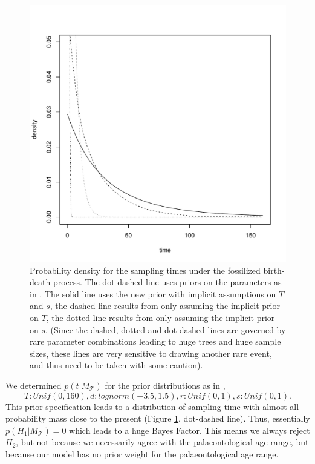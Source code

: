 \documentclass[11pt]{article}
\begin{document}
\begin{figure}
\includegraphics[width=12cm]{priors.pdf}
\caption{\label{hist8_older}Probability density for the sampling times under the fossilized birth-death process. The dot-dashed line uses priors on the parameters as in \cite{gavryushkina2015bayesian}. 
The solid line uses the new prior with implicit assumptions on $T$ and $s$, the dashed line results from only assuming the implicit prior on $T$, the dotted line results from only assuming the  implicit prior on $s$. 
(Since the dashed, dotted and dot-dashed lines are governed by rare parameter combinations leading to huge trees and huge sample sizes, these lines are very sensitive to drawing another rare event, and thus need to be taken with some caution).}
\label{Fig:Prior}
\end{figure}

We determined $p(t|M_\mathcal{T})$ for the prior distributions as in \cite{gavryushkina2015bayesian}, 
$$T: Unif(0,160), d: lognorm(-3.5,1.5), r: Unif(0,1), s: Unif(0,1).$$ This prior specification leads to a distribution of sampling time with almost all probability mass close to the present (Figure \ref{Fig:Prior}, dot-dashed line). Thus, essentially $p(H_1|M_\mathcal{T})=0$  which leads to a huge Bayes Factor. This means we always reject $H_2$, but not because we necessarily agree with the palaeontological age range, but because our model has no prior weight for the palaeontological age range.
\end{document}
